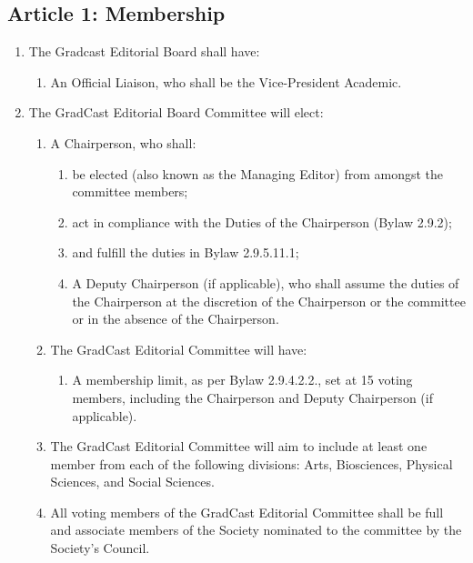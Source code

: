 \subsection{Article 1: Membership} 
\begin{enumerate} [label*=\arabic*., align=left]	
\item The Gradcast Editorial Board shall have: 
\begin{enumerate}[label*=\arabic*., align=left]	
\item An Official Liaison, who shall be the Vice-President Academic. 
\end{enumerate}
\item The GradCast Editorial Board Committee will elect:
\begin{enumerate}[label*=\arabic*., align=left]
\item A Chairperson, who shall:
\begin{enumerate}[label*=\arabic*., align=left]
\item be elected (also known as the Managing Editor) from amongst the committee members; 
\item act in compliance with the Duties of the Chairperson (Bylaw 2.9.2);
\item and fulfill the duties in Bylaw 2.9.5.11.1;
\item A Deputy Chairperson (if applicable), who shall assume the duties of the Chairperson at the discretion of the Chairperson or the committee or in the absence of the Chairperson.
\end{enumerate}
\item  The GradCast Editorial Committee will have:
\begin{enumerate}[label*=\arabic*., align=left]
\item A membership limit, as per Bylaw 2.9.4.2.2., set at 15 voting members, including the Chairperson and Deputy Chairperson (if applicable).
\end{enumerate}
\item The GradCast Editorial Committee will aim to include at least one member from each of the following divisions: Arts, Biosciences, Physical Sciences, and Social Sciences.
\item All voting members of the GradCast Editorial Committee shall be full and associate members of the Society nominated to the committee by the Society’s Council.
\end{enumerate}
\end{enumerate}

